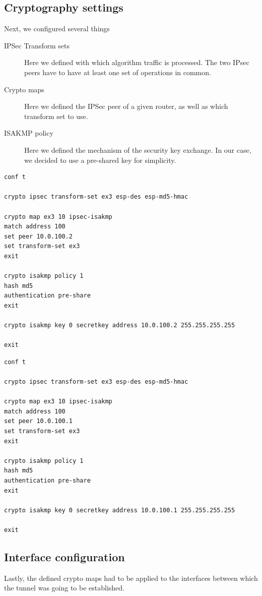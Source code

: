\documentclass[a4paper]{scrreprt}
\begin{document}
\subsection{Cryptography settings}

Next, we configured several things
\begin{description}
	\item[IPSec Transform sets] Here we defined with which algorithm
		traffic is processed. The two IPsec peers have to have at least
		one set of operations in common.
	\item[Crypto maps] Here we defined the IPSec peer of a given router, as
		well as which transform set to use.
	\item[ISAKMP policy] Here we defined the mechanism of the security key
		exchange. In our case, we decided to use a pre-shared key for
		simplicity.
\end{description}

\begin{lstlisting}[caption=Router 1]
conf t

crypto ipsec transform-set ex3 esp-des esp-md5-hmac

crypto map ex3 10 ipsec-isakmp
match address 100
set peer 10.0.100.2
set transform-set ex3
exit

crypto isakmp policy 1
hash md5
authentication pre-share
exit

crypto isakmp key 0 secretkey address 10.0.100.2 255.255.255.255

exit
\end{lstlisting}

\begin{lstlisting}[caption=Router 2]
conf t

crypto ipsec transform-set ex3 esp-des esp-md5-hmac

crypto map ex3 10 ipsec-isakmp
match address 100
set peer 10.0.100.1
set transform-set ex3
exit

crypto isakmp policy 1
hash md5
authentication pre-share
exit

crypto isakmp key 0 secretkey address 10.0.100.1 255.255.255.255

exit
\end{lstlisting}

\subsection{Interface configuration}

Lastly, the defined crypto maps had to be applied to the interfaces between
which the tunnel was going to be established.
\end{document}
